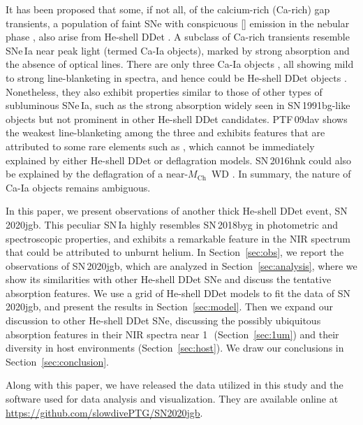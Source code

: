 \documentclass[twocolumn]{aastex631}
\newcommand{\sn}{SN\,2020jgb}
\newcommand{\Mch}{$M_\mathrm{Ch}$}
\begin{document}
It has been proposed that some, if not all, of the calcium-rich (Ca-rich) gap transients, a population of faint SNe with conspicuous [] emission in the nebular phase \citep{Filippenko_2003, Perets_2010, Kasliwal_2012}, also arise from He-shell DDet \citep{Dessart_2015,de_Ca_rich_2020,polin_nebular_2021}. A subclass of Ca-rich transients resemble SNe\,Ia near peak light (termed Ca-Ia objects), marked by strong  absorption and the absence of optical  lines. There are only three Ca-Ia objects \citep[PTF\,09dav, SN\,2016hnk, and SN\,2019ofm;][]{de_Ca_rich_2020}, all showing mild to strong line-blanketing in spectra, and hence could be He-shell DDet objects \citep[e.g.,][]{jacobson-galan_16hnk_2020}. Nonetheless, they also exhibit properties similar to those of other types of subluminous SNe\,Ia, such as the strong  absorption widely seen in SN\,1991bg-like \citep[91bg-like;][]{Filippenko_91bg_1992} objects  but not prominent in other He-shell DDet candidates. PTF\,09dav shows the weakest line-blanketing among the three and exhibits features that are attributed to some rare elements such as  \citep{Sullivan_2011}, which cannot be immediately explained by either He-shell DDet or deflagration models. SN\,2016hnk could also be explained by the deflagration of a near-\Mch\ WD \citep{galbany_16hnk_2019}. In summary, the nature of Ca-Ia objects remains ambiguous.

In this paper, we present observations of another thick He-shell DDet event, \sn. This peculiar SN\,Ia highly resembles SN\,2018byg in photometric and spectroscopic properties, and exhibits a remarkable feature in the NIR spectrum that could be attributed to unburnt helium. In Section~\ref{sec:obs}, we report the observations of \sn, which are analyzed in Section~\ref{sec:analysis}, where we show its similarities with other He-shell DDet SNe and discuss the tentative  absorption features. We use a grid of He-shell DDet models to fit the data of \sn, and present the results in Section~\ref{sec:model}. Then we expand our discussion to other He-shell DDet SNe, discussing the possibly ubiquitous absorption features in their NIR spectra near 1\,\micron\ (Section~\ref{sec:1um}) and their diversity in host environments (Section~\ref{sec:host}). We draw our conclusions in Section~\ref{sec:conclusion}.

Along with this paper, we have released the data utilized in this study and the software used for data analysis and visualization. They are available online at \url{https://github.com/slowdivePTG/SN2020jgb}.
\end{document}
